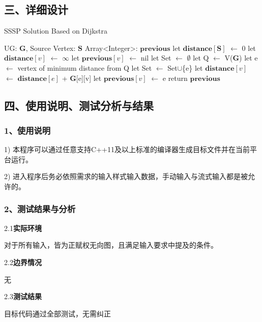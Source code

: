 \documentclass[UTF8, a4paper]{ctexart}
\begin{document}
\subsection*{三、详细设计}
\begin{algorithm}[H]
\begin{algorithmic}[1]
\caption{SSSP Solution Based on Dijkstra}
\Require UG: $\mathbf{G}$, Source Vertex: $\mathbf{S}$
\Ensure Array<Integer>: $\mathbf{previous}$
\State let $\mathbf{distance}[\mathbf{S}]$ $\gets$ 0
	\State let $\mathbf{distance}[v]$ $\gets$ $\infty$
\EndFor
{}
	\State let $\mathbf{previous}[v]$ $\gets$ nil
\EndFor
\State let Set $\gets$ $\emptyset$
\State let Q $\gets$ V($\mathbf{G}$)
	\State let e $\gets$ vertex of minimum distance from Q
	\State let Set $\gets$ Set$\cup$\{e\}
			\State let $\mathbf{distance}[v]$ $\gets$ $\mathbf{distance}[e]$ + $
			\mathbf{G}$[e][v]
			\State let $\mathbf{previous}[v]$ $\gets$ e
		\EndIf
	\EndFor
\EndWhile
\State return $\mathbf{previous}$
\end{algorithmic}
\end{algorithm}

\subsection*{四、使用说明、测试分析与结果}
\subsubsection*{1、使用说明}
1) 本程序可以通过任意支持C++11及以上标准的编译器生成目标文件并在当前平台运行。 \par
2) 进入程序后务必依照需求的输入样式输入数据，手动输入与流式输入都是被允许的。 \par
\subsubsection*{2、测试结果与分析}
2.1\;\textbf{实际环境} \par
对于所有输入，皆为正赋权无向图，且满足输入要求中提及的条件。 \par
2.2\;\textbf{边界情况} \par
无 \par
2.3\;\textbf{测试结果} \par
目标代码通过全部测试，无需纠正 \par
\end{document}
